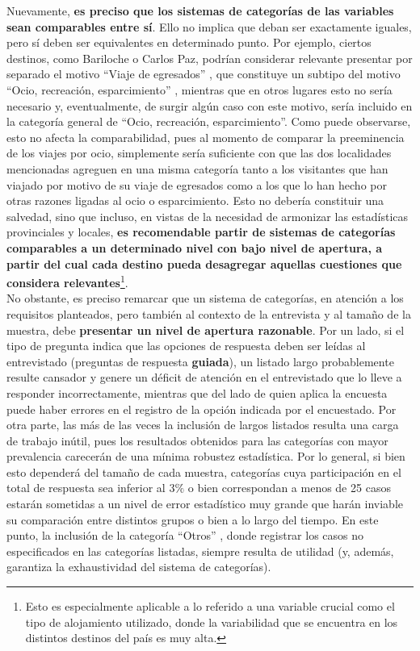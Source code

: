 \documentclass[
]{book}
\begin{document}
Nuevamente, \textbf{es preciso que los sistemas de categorías de las variables sean comparables entre sí}. Ello no implica que deban ser exactamente iguales, pero sí deben ser equivalentes en determinado punto. Por ejemplo, ciertos destinos, como Bariloche o Carlos Paz, podrían considerar relevante presentar por separado el motivo ``Viaje de egresados'' , que constituye un subtipo del motivo ``Ocio, recreación, esparcimiento'' , mientras que en otros lugares esto no sería necesario y, eventualmente, de surgir algún caso con este motivo, sería incluido en la categoría general de ``Ocio, recreación, esparcimiento''. Como puede observarse, esto no afecta la comparabilidad, pues al momento de comparar la preeminencia de los viajes por ocio, simplemente sería suficiente con que las dos localidades mencionadas agreguen en una misma categoría tanto a los visitantes que han viajado por motivo de su viaje de egresados como a los que lo han hecho por otras razones ligadas al ocio o esparcimiento. Esto no debería constituir una salvedad, sino que incluso, en vistas de la necesidad de armonizar las estadísticas provinciales y locales, \textbf{es recomendable partir de sistemas de categorías comparables a un determinado nivel con bajo nivel de apertura, a partir del cual cada destino pueda desagregar aquellas cuestiones que considera relevantes}\footnote{Esto es especialmente aplicable a lo referido a una variable crucial como el tipo de alojamiento utilizado, donde la variabilidad que se encuentra en los distintos destinos del país es muy alta.}.\\

No obstante, es preciso remarcar que un sistema de categorías, en atención a los requisitos planteados, pero también al contexto de la entrevista y al tamaño de la muestra, debe \textbf{presentar un nivel de apertura razonable}. Por un lado, si el tipo de pregunta indica que las opciones de respuesta deben ser leídas al entrevistado (preguntas de respuesta \textbf{guiada}), un listado largo probablemente resulte cansador y genere un déficit de atención en el entrevistado que lo lleve a responder incorrectamente, mientras que del lado de quien aplica la encuesta puede haber errores en el registro de la opción indicada por el encuestado. Por otra parte, las más de las veces la inclusión de largos listados resulta una carga de trabajo inútil, pues los resultados obtenidos para las categorías con mayor prevalencia carecerán de una mínima robustez estadística. Por lo general, si bien esto dependerá del tamaño de cada muestra, categorías cuya participación en el total de respuesta sea inferior al \(3\%\) o bien correspondan a menos de 25 casos estarán sometidas a un nivel de error estadístico muy grande que harán inviable su comparación entre distintos grupos o bien a lo largo del tiempo. En este punto, la inclusión de la categoría ``Otros'' , donde registrar los casos no especificados en las categorías listadas, siempre resulta de utilidad (y, además, garantiza la exhaustividad del sistema de categorías).
\end{document}
